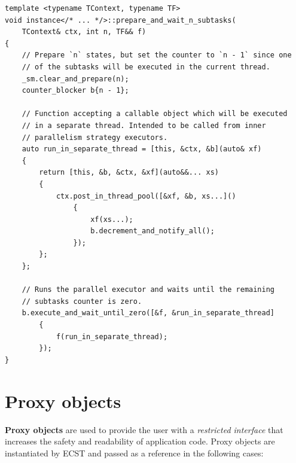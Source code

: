 \documentclass[oneside, 12pt, a4paper, openany]{book}
\begin{document}
\begin{verbatim}
template <typename TContext, typename TF>
void instance</* ... */>::prepare_and_wait_n_subtasks(
    TContext& ctx, int n, TF&& f)
{
    // Prepare `n` states, but set the counter to `n - 1` since one
    // of the subtasks will be executed in the current thread.
    _sm.clear_and_prepare(n);
    counter_blocker b{n - 1};

    // Function accepting a callable object which will be executed
    // in a separate thread. Intended to be called from inner
    // parallelism strategy executors.
    auto run_in_separate_thread = [this, &ctx, &b](auto& xf)
    {
        return [this, &b, &ctx, &xf](auto&&... xs)
        {
            ctx.post_in_thread_pool([&xf, &b, xs...]()
                {
                    xf(xs...);
                    b.decrement_and_notify_all();
                });
        };
    };

    // Runs the parallel executor and waits until the remaining
    // subtasks counter is zero.
    b.execute_and_wait_until_zero([&f, &run_in_separate_thread]
        {
            f(run_in_separate_thread);
        });
}
\end{verbatim}

\hypertarget{chap_proxies}{\chapter{Proxy objects}\label{chap_proxies}}

\textbf{Proxy objects} are used to provide the user with a
\emph{restricted interface} that increases the safety and readability of
application code. Proxy objects are instantiated by ECST and passed as a
reference in the following cases:
\end{document}

